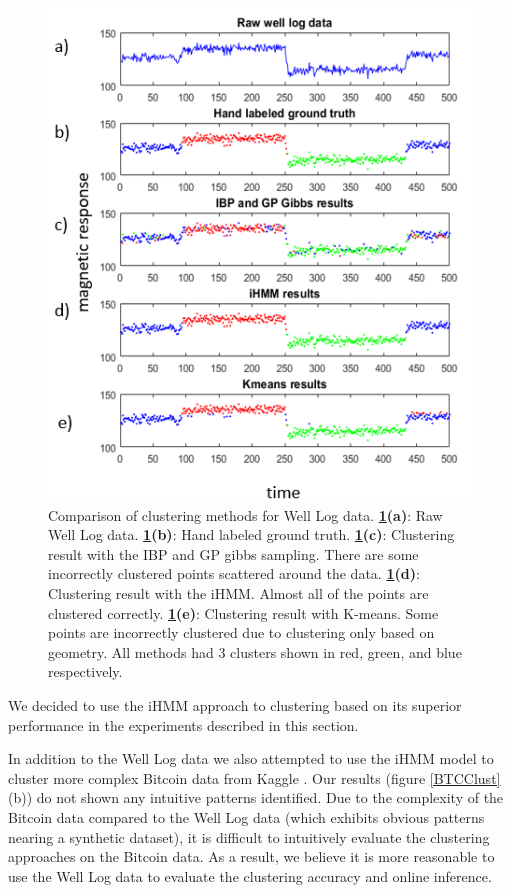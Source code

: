 \documentclass{article}
\begin{document}
\begin{figure}[ht]
\vskip 0.2in
\begin{center}
\centerline{\includegraphics[width=\columnwidth]{OFClust}}
\caption{Comparison of clustering methods for Well Log data. \textbf{\ref{OFClust}(a)}: Raw Well Log data. \textbf{\ref{OFClust}(b)}: Hand labeled ground truth. \textbf{\ref{OFClust}(c)}: Clustering result with the IBP and GP gibbs sampling. There are some incorrectly clustered points scattered around the data. \textbf{\ref{OFClust}(d)}: Clustering result with the iHMM. Almost all of the points are clustered correctly. \textbf{\ref{OFClust}(e)}: Clustering result with K-means. Some points are incorrectly clustered due to clustering only based on geometry. All methods had 3 clusters shown in red, green, and blue respectively.}
\label{OFClust}
\end{center}
\vskip -0.2in
\end{figure} 

We decided to use the iHMM approach to clustering based on its superior performance in the experiments described in this section. 

In addition to the Well Log data we also attempted to use the iHMM model to cluster more complex Bitcoin data from Kaggle \cite{KaggleBit}. Our results (figure \ref{BTCClust}(b)) do not shown any intuitive patterns identified. Due to the complexity of the Bitcoin data compared to the Well Log data (which exhibits obvious patterns nearing a synthetic dataset), it is difficult to intuitively evaluate the clustering approaches on the Bitcoin data. As a result, we believe it is more reasonable to use the Well Log data to evaluate the clustering accuracy and online inference.
\end{document}
